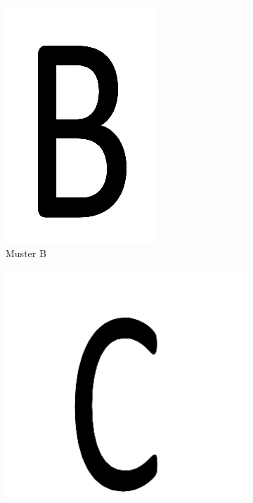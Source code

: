 \begin{figure}[H]
\begin{subfigure}{0.3\textwidth}
\includegraphics[width=0.95\linewidth]{assets/informatik-prototyp/opencv/target_node_detection/b.png} 
\caption{Muster B}
\label{fig:image-b}
\end{subfigure}
\begin{subfigure}{0.3\textwidth}
\includegraphics[width=0.95\linewidth]{assets/informatik-prototyp/opencv/target_node_detection/c.png} 

\end{subfigure}
\end{figure}

